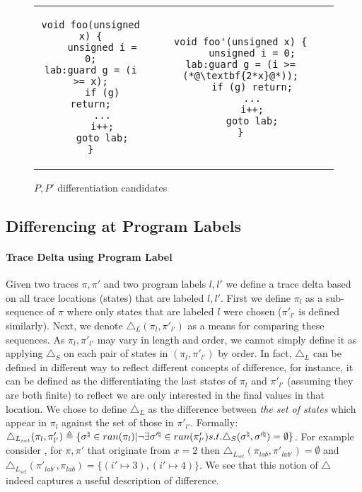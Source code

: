 \begin{figure}
\begin{tabular}{cc}
\centering
\begin{lstlisting}
void foo(unsigned x) {
    unsigned i = 0;
lab:guard g = (i >= x);
    if (g) return;
    ...
    i++;
    goto lab;
}
\end{lstlisting}
&
\begin{lstlisting}
void foo'(unsigned x) {
    unsigned i = 0;
lab:guard g = (i >= (*@\textbf{2*x}@*));
    if (g) return;
    ...
    i++;
    goto lab;
}
\end{lstlisting}
\end{tabular}
\caption{$P,P'$ differentiation candidates}
\end{figure}

\subsection{Differencing at Program Labels} 

\paragraph{Trace Delta using Program Label} 
Given two traces $\pi,\pi'$ and two program labels $l,l'$ we define a trace delta based on all trace locations (states) that are labeled $l,l'$. First we define $\pi_{l}$ as a sub-sequence of $\pi$ where only states that are labeled $l$ were chosen ($\pi'_{l'}$ is defined similarly). Next, we denote $\triangle_L(\pi_{l},\pi'_{l'})$ as a means for comparing these sequences. As $\pi_{l},\pi'_{l'}$ may vary in length and order, we cannot simply define it as applying $\triangle_{S}$ on each pair of states in $(\pi_{l},\pi'_{l'})$ by order. In fact, $\triangle_{L}$ can be defined in different way to reflect different concepts of difference, for instance, it can be defined as the differentiating the last states of $\pi_{l}$ and $\pi'_{l'}$ (assuming they are both finite) to reflect we are only interested in the final values in that location. We chose to define $\triangle_{L}$ as the difference between \emph{the set of states} which appear in $\pi_{l}$ against the set of those in $\pi'_{l'}$. Formally: $\triangle_{L_{set}}(\pi_{l},\pi'_{l'}) \triangleq \{ \sigma^\natural \in ran(\pi_{l}) | \neg \exists \sigma'^\natural \in ran(\pi'_{l'}) s.t. \triangle_{S}(\sigma^\natural,\sigma'^\natural) = \emptyset \}$. For example consider , for $\pi, \pi'$ that originate from $x=2$  then $\triangle_{L_{set}}(\pi_{lab},\pi'_{lab'}) = \emptyset$ and $\triangle_{L_{set}}(\pi'_{lab'},\pi_{lab}) = \{ (i' \mapsto 3),(i' \mapsto 4) \}$. We see that this notion of $\triangle$ indeed captures a useful description of difference.

